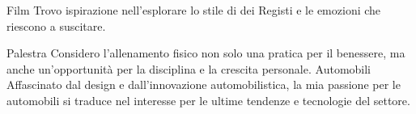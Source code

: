 



\begin{cvskills}
  \cvskill
    {Film} %
    {Trovo ispirazione nell'esplorare lo stile di dei Registi e le emozioni che riescono a suscitare.} %

  \cvskill
    {Palestra} %
    {Considero l'allenamento fisico non solo una pratica per il benessere, ma anche un'opportunità per la disciplina e la crescita personale.} %
  \cvskill
    {Automobili} %
    {Affascinato dal design e dall'innovazione automobilistica, la mia passione per le automobili si traduce nel interesse per le ultime tendenze e tecnologie del settore.} %

\end{cvskills}